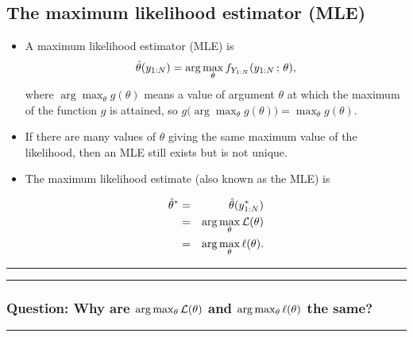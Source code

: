 \documentclass[]{article}
\begin{document}
\subsection{The maximum likelihood estimator
(MLE)}\label{the-maximum-likelihood-estimator-mle}

\begin{itemize}
\item
  A maximum likelihood estimator (MLE) is
  \[ \hat\theta(y_{1:N}) = \arg\max_\theta f_{Y_{1:N}}(y_{1:N}\, ; \,\theta),\]
  where \(\arg\max_\theta g(\theta)\) means a value of argument
  \(\theta\) at which the maximum of the function \(g\) is attained, so
  \(g\big(\arg\max_\theta g(\theta)\big) = \max_\theta g(\theta)\).
\item
  If there are many values of \(\theta\) giving the same maximum value
  of the likelihood, then an MLE still exists but is not unique.
\item
  The maximum likelihood estimate (also known as the MLE) is

  \begin{eqnarray} \hat\theta^* &=& \hat\theta(y_{1:N}^*)
  \\
  &=& \arg\max_\theta \mathcal{L}(\theta)
  \\
  &=& \arg\max_\theta \ell(\theta).
  \end{eqnarray}
\end{itemize}

\begin{center}\rule{0.5\linewidth}{\linethickness}\end{center}

\begin{center}\rule{0.5\linewidth}{\linethickness}\end{center}

\subsubsection{\texorpdfstring{Question: Why are
\(\arg\max_\theta \mathcal{L}(\theta)\) and \(\arg\max_\theta \ell(\theta)\)
the
same?}{Question: Why are \textbackslash{}arg\textbackslash{}max\_\textbackslash{}theta \textbackslash{}lik(\textbackslash{}theta) and \textbackslash{}arg\textbackslash{}max\_\textbackslash{}theta \textbackslash{}loglik(\textbackslash{}theta) the same?}}\label{question-why-are-argmax_theta-liktheta-and-argmax_theta-logliktheta-the-same}

\begin{center}\rule{0.5\linewidth}{\linethickness}\end{center}
\end{document}

